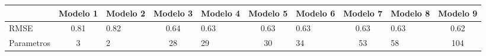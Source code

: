
\begin{longtable}{lclclclclc}
\toprule
\textbf{} & \textbf{Modelo 1} & \textbf{Modelo 2} & \textbf{Modelo 3} & \textbf{Modelo 4} & \textbf{Modelo 5} & \textbf{Modelo 6} & \textbf{Modelo 7} & \textbf{Modelo 8} & \textbf{Modelo 9}\\
\midrule
RMSE & 0.81 & 0.82 & 0.64 & 0.63 & 0.63 & 0.63 & 0.63 & 0.63 & 0.62\\
Parametros & 3 & 2 & 28 & 29 & 30 & 34 & 53 & 58 & 104\\
\bottomrule
\end{longtable}
